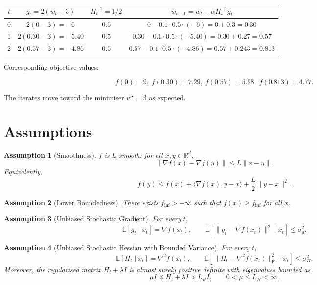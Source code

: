 \documentclass{article}
\newcommand{\E}{\mathbb{E}}
\newcommand{\R}{\mathbb{R}}
\newtheorem{assumption}{Assumption}
\begin{document}
\begin{center}
\begin{tabular}{c|c|c|c}
$t$ & $g_t=2(w_t-3)$ & $H_t^{-1}=1/2$ & $w_{t+1}=w_t-\alpha H_t^{-1}g_t$\\ \hline
0 & $2(0-3)=-6$ & $0.5$ & $0-0.1\cdot0.5\cdot(-6)=0+0.3=0.30$\\
1 & $2(0.30-3)=-5.40$ & $0.5$ & $0.30-0.1\cdot0.5\cdot(-5.40)=0.30+0.27=0.57$\\
2 & $2(0.57-3)=-4.86$ & $0.5$ & $0.57-0.1\cdot0.5\cdot(-4.86)=0.57+0.243=0.813$\\
\end{tabular}
\end{center}

Corresponding objective values:

\[
f(0)=9,\; f(0.30)=7.29,\; f(0.57)=5.88,\; f(0.813)=4.77.
\]

The iterates move toward the minimiser $w^{\star}=3$ as expected.

\section*{Assumptions}
\begin{assumption}[Smoothness]\label{ass:smooth}
$f$ is $L$‑smooth: for all $x,y\in\R^{d}$,
\[
\|\nabla f(x)-\nabla f(y)\|\le L\|x-y\|.
\]
Equivalently,
\[
f(y)\le f(x)+\langle\nabla f(x),y-x\rangle+\frac{L}{2}\|y-x\|^{2}.
\tag{2}
\]
\end{assumption}

\begin{assumption}[Lower Boundedness]\label{ass:lb}
There exists $f_{\inf}>-\infty$ such that $f(x)\ge f_{\inf}$ for all $x$.
\end{assumption}

\begin{assumption}[Unbiased Stochastic Gradient]\label{ass:grad}
For every $t$,
\[
\E\!\left[g_t\mid x_t\right]=\nabla f(x_t),\qquad 
\E\!\left[\|g_t-\nabla f(x_t)\|^{2}\mid x_t\right]\le\sigma_{g}^{2}.
\tag{3}
\]
\end{assumption}

\begin{assumption}[Unbiased Stochastic Hessian with Bounded Variance]\label{ass:hess}
For every $t$,
\[
\E\!\left[H_t\mid x_t\right]=\nabla^{2}f(x_t),\qquad 
\E\!\left[\|H_t-\nabla^{2}f(x_t)\|^{2}_{\mathrm{F}}\mid x_t\right]\le\sigma_{H}^{2}.
\tag{4}
\]
Moreover, the regularised matrix $H_t+\lambda I$ is almost surely positive definite with eigenvalues bounded as
\[
\mu I\preceq H_t+\lambda I\preceq L_H I,\qquad 0<\mu\le L_H<\infty .
\tag{5}
\]
\end{assumption}
\end{document}
